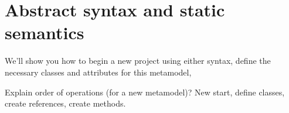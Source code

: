 \newpage
\section{Abstract syntax and static semantics}
\label{sec: staticSemantics}

We'll show you how to begin a new project using either syntax, define the necessary classes and attributes for this metamodel, 

{ \scriptsize Explain order of operations (for a new metamodel)? New start, define classes, create references, create methods.}












 
